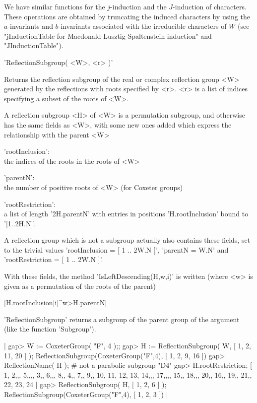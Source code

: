 We have similar functions for  the $j$-induction and the $J$-induction of
characters. These operations   are obtained  by truncating  the   induced
characters by using the $a$-invariants and $b$-invariants associated with
the   irreducible  characters     of  $W$  (see    "jInductionTable for
Macdonald-Lusztig-Spaltenstein induction" and "JInductionTable").


'ReflectionSubgroup( <W>, <r> )'

Returns the reflection subgroup of  the real or complex reflection group
<W> generated by  the reflections with roots specified by  <r>. <r> is a
list of indices specifying a subset of the roots of <W>.

A  reflection  subgroup  <H>  of  <W> is  a  permutation  subgroup,  and
otherwise has  the same fields  as <W>, with  some new ones  added which
express the relationship with the parent <W>\:

  'rootInclusion':\\ the indices of the roots in the roots of <W>

  'parentN':\\ the number of positive roots of <W> (for Coxeter groups)

  'rootRestriction':\\ a list of length   '2\*H.parentN' with entries  in
      positions 'H.rootInclusion' bound to '[1..2\*H.N]'.

A reflection group which is not  a subgroup actually also contains these
fields, set to  the trivial values\: 'rootInclusion = [  1 .. 2\*W.N ]',
'parentN = W.N' and 'rootRestriction = [ 1 .. 2\*W.N ]'.

With  these  fields,  the method  'IsLeftDescending(H,w,i)'  is  written
(where <w> is given as a permutation of the roots of the parent)

|H.rootInclusion[i]^w>H.parentN|

'ReflectionSubgroup' returns a subgroup    of  the parent group  of   the
argument (like the {\GAP} function 'Subgroup').


|    gap> W := CoxeterGroup( "F", 4 );;
    gap> H := ReflectionSubgroup( W, [ 1, 2, 11, 20 ] );
    ReflectionSubgroup(CoxeterGroup("F",4), [ 1, 2, 9, 16 ])
    gap> ReflectionName( H );  # not a parabolic subgroup
    "D4"
    gap> H.rootRestriction;
    [ 1, 2,,, 5,,,, 3,, 6,,, 8,, 4,, 7,, 9,, 10, 11, 12, 13, 14,,, 17,,,,
      15,, 18,,, 20,, 16,, 19,, 21,, 22, 23, 24 ]
    gap> ReflectionSubgroup( H, [ 1, 2, 6 ] );
    ReflectionSubgroup(CoxeterGroup("F",4), [ 1, 2, 3 ]) |

